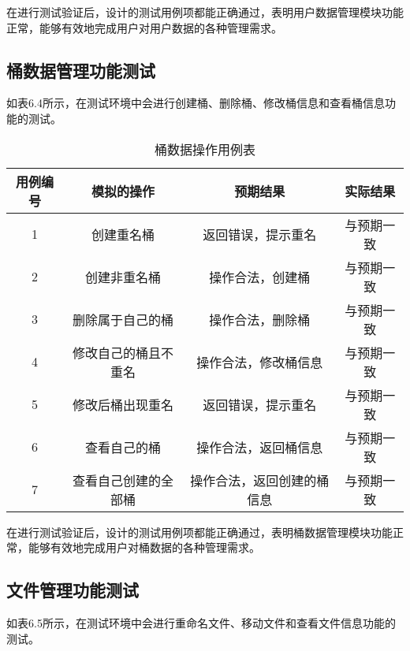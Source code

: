 在进行测试验证后，设计的测试用例项都能正确通过，表明用户数据管理模块功能正常，能够有效地完成用户对用户数据的各种管理需求。

\subsection{桶数据管理功能测试}

如表6.4所示，在测试环境中会进行创建桶、删除桶、修改桶信息和查看桶信息功能的测试。

\begin{table}[h]
  \centering
  \caption{桶数据操作用例表}
  \begin{tabular}{cccc}
    \toprule
    用例编号 & 模拟的操作   & 预期结果  & 实际结果 \\
    \midrule
    1 & 创建重名桶           & 返回错误，提示重名         & 与预期一致\\
    2 & 创建非重名桶          & 操作合法，创建桶          & 与预期一致\\
    3 & 删除属于自己的桶      & 操作合法，删除桶           & 与预期一致\\
    4 & 修改自己的桶且不重名   & 操作合法，修改桶信息       & 与预期一致\\
    5 & 修改后桶出现重名      & 返回错误，提示重名         & 与预期一致\\
    6 & 查看自己的桶          & 操作合法，返回桶信息       & 与预期一致\\
    7 & 查看自己创建的全部桶   & 操作合法，返回创建的桶信息  & 与预期一致\\
    \bottomrule
  \end{tabular}
\end{table}

在进行测试验证后，设计的测试用例项都能正确通过，表明桶数据管理模块功能正常，能够有效地完成用户对桶数据的各种管理需求。

\subsection{文件管理功能测试}

如表6.5所示，在测试环境中会进行重命名文件、移动文件和查看文件信息功能的测试。

